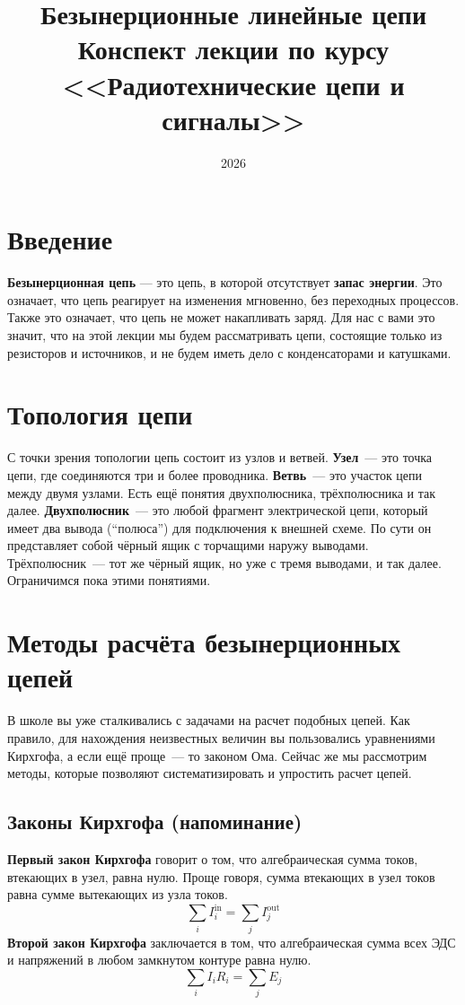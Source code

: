 \documentclass[11pt,a4paper]{article}
\title{Безынерционные линейные цепи\\[0.35em]
       \large Конспект лекции по курсу <<Радиотехнические цепи и сигналы>>}
\author{}
\date{2026}
\begin{document}
\maketitle
\thispagestyle{empty}

\tableofcontents
\newpage

{}
\section*{Введение}
\textbf{Безынерционная цепь} --- это цепь, в которой отсутствует \textbf{запас энергии}. 
Это означает, что цепь реагирует на изменения мгновенно, без переходных процессов. Также 
это означает, что цепь не может накапливать заряд.
Для нас с вами это значит, что на этой лекции мы будем рассматривать цепи, состоящие только
 из резисторов и источников, и не будем иметь дело с конденсаторами и катушками. 

\section{Топология цепи}
С точки зрения топологии цепь состоит из узлов и ветвей. \textbf{Узел}~--- это точка цепи, 
где соединяются три и более проводника. \textbf{Ветвь}~--- это участок цепи между двумя узлами.
Есть ещё понятия двухполюсника, трёхполюсника и так далее. \textbf{Двухполюсник}~--- это любой 
фрагмент электрической цепи, который имеет два вывода (``полюса'') для подключения к внешней 
схеме. По сути он представляет собой чёрный ящик с торчащими наружу выводами. Трёхполюсник~---
тот же чёрный ящик, но уже с тремя выводами, и так далее. Ограничимся пока этими понятиями.

\section{Методы расчёта безынерционных цепей}
В школе вы уже сталкивались с задачами на расчет подобных цепей. Как правило, для нахождения
неизвестных величин вы пользовались уравнениями Кирхгофа, а если ещё проще~--- то законом Ома.
 Сейчас же мы рассмотрим методы, которые позволяют систематизировать и упростить расчет цепей.

\subsection{Законы Кирхгофа (напоминание)}
\textbf{Первый закон Кирхгофа} говорит о том, что алгебраическая сумма токов, втекающих в
 узел, равна нулю. Проще говоря, сумма втекающих в узел токов равна сумме вытекающих из узла токов.
$$
\sum_i I_i^{\text{in}} = \sum_j I_j^{\text{out}} 
$$
\textbf{Второй закон Кирхгофа} заключается в том, что алгебраическая сумма всех ЭДС и
 напряжений в любом замкнутом контуре равна нулю.
$$
\sum \limits_i I_i R_i = \sum\limits_j E_j
$$
\end{document}

